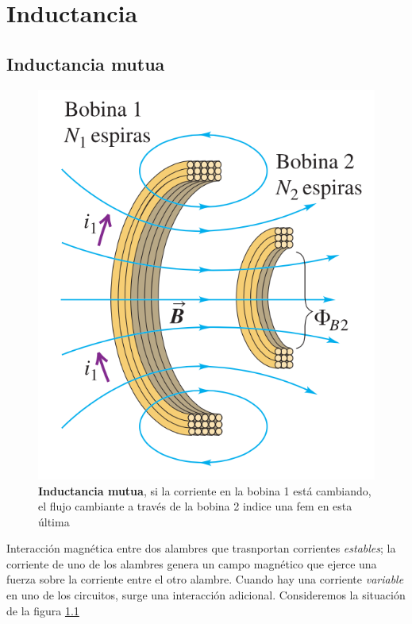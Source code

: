\chapter{Inductancia}
\section{Inductancia mutua}

\begin{figure}[h]
\centering
\includegraphics[scale=0.3]{fig/bobinas}
\caption{\textbf{Inductancia mutua}, si la corriente en la bobina 1 está cambiando, el flujo cambiante a través de la bobina 2 indice una fem en esta última}
\label{fig:bobinas}
\end{figure}
Interacción magnética entre dos alambres que trasnportan corrientes \textit{estables}; la corriente de uno de los alambres genera un campo magnético que ejerce una fuerza sobre la corriente entre el otro alambre. Cuando hay una corriente \textit{variable} en uno de los circuitos, surge una interacción adicional. Consideremos la situación de la figura
\ref{fig:bobinas}

